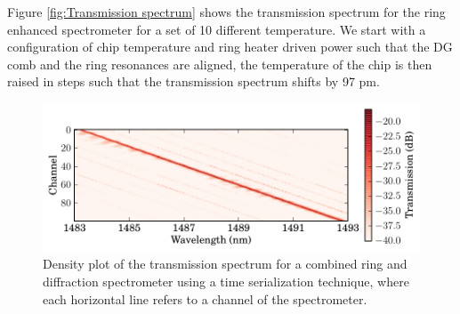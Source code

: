 \documentclass[12pt,twoside,english]{book}
\renewcommand{\~}{\perispomeni}%
\numberwithin{equation}{section}
\numberwithin{figure}{section}
\begin{document}
Figure \ref{fig:Transmission spectrum} shows the transmission spectrum for the ring enhanced spectrometer for a set of 10 different temperature. We start with a configuration of chip temperature and ring heater driven power such that the DG comb and the ring resonances are aligned, the temperature of the chip is then raised in steps such that the transmission spectrum shifts by 97 pm.
%
\begin{figure}[h]
\noindent \begin{centering}
\includegraphics{graphs/hundred_density}
\par\end{centering}
\caption{Density plot of the transmission spectrum for a combined ring and diffraction spectrometer using a time serialization technique, where each horizontal line refers to a channel of the spectrometer.
\label{fig:transmission spectrum density}}
\end{figure}
\end{document}
